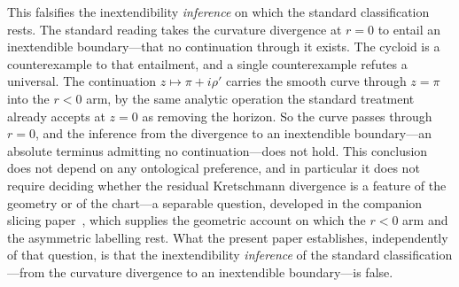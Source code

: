 \documentclass[11pt,a4paper]{article}
\theoremstyle{definition}
\begin{document}
This falsifies the inextendibility \emph{inference} on which the standard classification rests. The standard reading takes the curvature divergence at $r=0$ to entail an inextendible boundary---that no continuation through it exists. The cycloid is a counterexample to that entailment, and a single counterexample refutes a universal. The continuation $z \mapsto \pi + i\rho'$ carries the smooth curve through $z=\pi$ into the $r<0$ arm, by the same analytic operation the standard treatment already accepts at $z=0$ as removing the horizon. So the curve passes through $r=0$, and the inference from the divergence to an inextendible boundary---an absolute terminus admitting no continuation---does not hold. This conclusion does not depend on any ontological preference, and in particular it does not require deciding whether the residual Kretschmann divergence is a feature of the geometry or of the chart---a separable question, developed in the companion slicing paper~\cite{JanzenSlicing}, which supplies the geometric account on which the $r<0$ arm and the asymmetric labelling rest. What the present paper establishes, independently of that question, is that the inextendibility \emph{inference} of the standard classification---from the curvature divergence to an inextendible boundary---is false.
\end{document}
